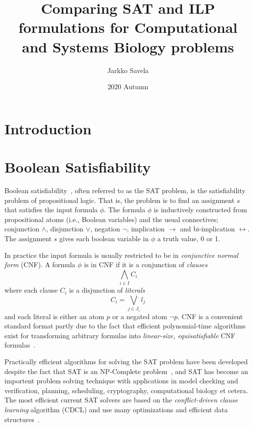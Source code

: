 \documentclass[12pt,a4paper]{article}
\title{Comparing SAT and ILP formulations for Computational and Systems Biology problems}
\date{2020 Autumn}
\author{Jarkko Savela}
\begin{document}
\maketitle
\newpage
\tableofcontents
\newpage
{}

\section{Introduction}


\section{Boolean Satisfiability}
Boolean satisfiability~\cite{DBLP:series/faia/2009-185}, often referred to as the SAT problem, is the satisfiability problem of propositional logic.
That is, the problem is to find an assignment $s$ that satisfies the input formula $\phi$.
The formula $\phi$ is inductively constructed from propositional atoms (i.e., Boolean variables) and the usual connectives; conjunction $\wedge$, disjunction $\vee$, negation $\neg$, implication $\rightarrow$ and bi-implication $\leftrightarrow$.
The assignment $s$ gives each boolean variable in $\phi$ a truth value, 0 or 1.

In practice the input formula is usually restricted to be in \emph{conjunctive normal form} (CNF).
A formula $\phi$ is in CNF if it is a conjunction of \emph{clauses}
$$ \bigwedge_{i\in I} C_i $$
where each clause $C_i$ is a disjunction of \emph{literals}
$$ C_i = \bigvee_{j\in J_i} l_j $$
and each literal is either an atom $p$ or a negated atom $\neg p$.
CNF is a convenient standard format partly due to the fact that efficient polynomial-time algorithms exist for transforming arbitrary formulas into \emph{linear-size, equisatisfiable} CNF formulas~\cite{tseitin1983, DBLP:journals/jsc/PlaistedG86}.

Practically efficient algorithms for solving the SAT problem have been developed despite the fact that SAT is an NP-Complete problem~\cite{DBLP:conf/stoc/Cook71}, 
and SAT has become an importent problem solving technique with applications in model checking and verification, planning, scheduling, cryptography, computational biology et cetera.
The most efficient current SAT solvers are based on the \emph{conflict-driven clause learning} algorithm (CDCL) and use many optimizations and efficient data structures~\cite{DBLP:conf/iccad/SilvaS96, DBLP:journals/tc/Marques-SilvaS99, DBLP:conf/dac/MoskewiczMZZM01, DBLP:conf/aaai/GomesSK98, DBLP:journals/dam/GoldbergN07, ryan2004efficient, DBLP:conf/aaai/BayardoS97, DBLP:conf/sat/LewisSB05}.
\end{document}

